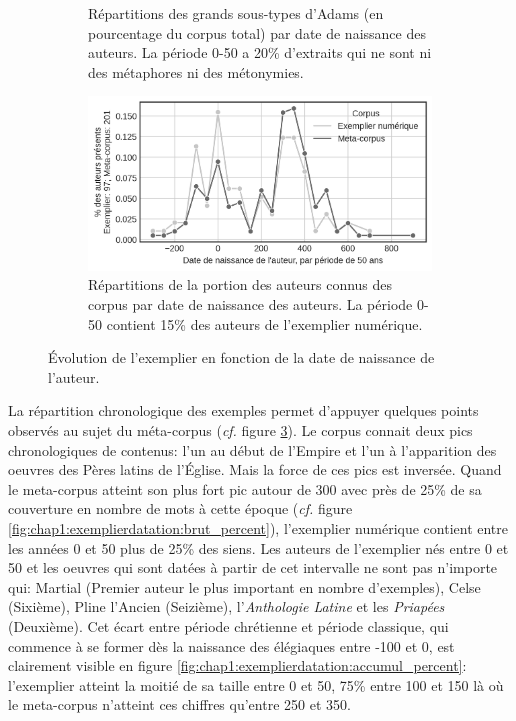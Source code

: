 {\begin{figure}
\begin{subfigure}{0.45\hsize}
        \caption{Répartitions des grands sous-types d'Adams (en pourcentage du corpus total) par date de naissance des auteurs. La période 0-50 a 20\% d'extraits qui ne sont ni des métaphores ni des métonymies.}
        \label{fig:chap1:exemplierdatation:tags}
    \end{subfigure}%
    \hfill
    \begin{subfigure}{0.45\hsize}
        \includegraphics[width=\linewidth]{figures/chap1/part3/exemplier/evol_auteurs_exemplier.png}
        \caption{Répartitions de la portion des auteurs connus des corpus par date de naissance des auteurs. La période 0-50 contient 15\% des auteurs de l'exemplier numérique.}
        \label{fig:chap1:exemplierdatation:auteurs}
    \end{subfigure}%
    \caption{Évolution de l'exemplier en fonction de la date de naissance de l'auteur.}
    \label{fig:chap1:exemplierdatation}
\end{figure}%
\clearpage
}

La répartition chronologique des exemples permet d'appuyer quelques points observés au sujet du méta-corpus (\textit{cf.} figure \ref{fig:chap1:exemplierdatation}). Le corpus connait deux pics chronologiques de contenus: l'un au début de l'Empire et l'un à l'apparition des oeuvres des Pères latins de l'Église. Mais la force de ces pics est inversée. Quand le meta-corpus atteint son plus fort pic autour de 300 avec près de 25\% de sa couverture en nombre de mots à cette époque (\textit{cf.} figure \ref{fig:chap1:exemplierdatation:brut_percent}), l'exemplier numérique contient entre les années 0 et 50 plus de 25\% des siens. Les auteurs de l'exemplier nés entre 0 et 50 et les oeuvres qui sont datées à partir de cet intervalle ne sont pas n'importe qui: Martial (Premier auteur le plus important en nombre d'exemples), Celse (Sixième), Pline l'Ancien (Seizième), l'\textit{Anthologie Latine} et les \textit{Priapées} (Deuxième). Cet écart entre période chrétienne et période classique, qui commence à se former dès la naissance des élégiaques entre -100 et 0, est clairement visible en figure \ref{fig:chap1:exemplierdatation:accumul_percent}: l'exemplier atteint la moitié de sa taille entre 0 et 50, 75\% entre 100 et 150 là où le meta-corpus n'atteint ces chiffres qu'entre 250 et 350.


